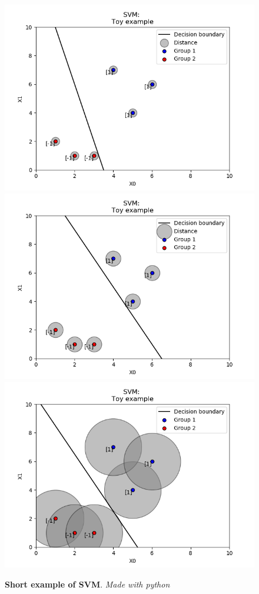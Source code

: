 \documentclass[a4paper,11pt]{article}
\numberwithin{equation}{section}
\begin{document}
\begin{figure}[htb]%
    \begin{center}
    \includegraphics[scale = 0.5]{Figure1SVM.png}%
    \qquad
    \includegraphics[scale = 0.5]{Figure2SVM.png}%
    \qquad
    \includegraphics[scale = 0.5]{Figure3SVM.png}%
    \caption{\textbf{Short example of SVM}. \textit{Made with python}}%
    \label{fig:example}%
    \end{center}
\end{figure}
\end{document}
